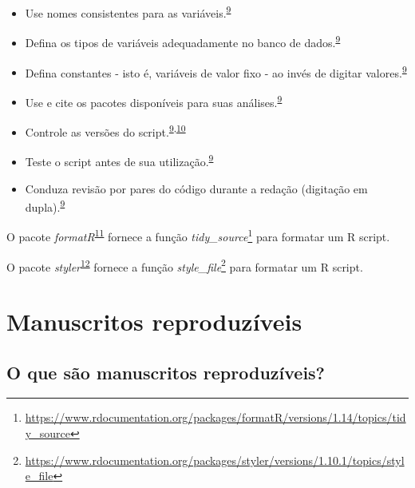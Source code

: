 \documentclass[
  a4paper,
]{book}
\renewcommand{\href}[2]{#2\footnote{\url{#1}}}
\newenvironment{infobox}[1]
  {
  \begin{itemize}
  \renewcommand{\labelitemi}{
    \raisebox{-.7\height}[0pt][0pt]{
      {\setkeys{Gin}{width=3em,keepaspectratio}
        \texttt{[image: \#1]}}
    }
  }
  \setlength{\fboxsep}{1em}
  \begin{blackbox}
  \item
  }
  {
  \end{blackbox}
  \end{itemize}
  }
\begin{document}
\begin{itemize}
\item
  Use nomes consistentes para as variáveis.\textsuperscript{\protect\hyperlink{ref-SchwabSimon2021}{9}}
\item
  Defina os tipos de variáveis adequadamente no banco de dados.\textsuperscript{\protect\hyperlink{ref-SchwabSimon2021}{9}}
\item
  Defina constantes - isto é, variáveis de valor fixo - ao invés de digitar valores.\textsuperscript{\protect\hyperlink{ref-SchwabSimon2021}{9}}
\item
  Use e cite os pacotes disponíveis para suas análises.\textsuperscript{\protect\hyperlink{ref-SchwabSimon2021}{9}}
\item
  Controle as versões do script.\textsuperscript{\protect\hyperlink{ref-SchwabSimon2021}{9},\protect\hyperlink{ref-Eglen2017}{10}}
\item
  Teste o script antes de sua utilização.\textsuperscript{\protect\hyperlink{ref-SchwabSimon2021}{9}}
\item
  Conduza revisão por pares do código durante a redação (digitação em dupla).\textsuperscript{\protect\hyperlink{ref-SchwabSimon2021}{9}}
\end{itemize}

\begin{infobox}{images/Rlogo}
O pacote \emph{formatR}\textsuperscript{\protect\hyperlink{ref-formatR}{11}} fornece a função \href{https://www.rdocumentation.org/packages/formatR/versions/1.14/topics/tidy_source}{\emph{tidy\_source}} para formatar um R script.

\end{infobox}

\begin{infobox}{images/Rlogo}
O pacote \emph{styler}\textsuperscript{\protect\hyperlink{ref-styler}{12}} fornece a função \href{https://www.rdocumentation.org/packages/styler/versions/1.10.1/topics/style_file}{\emph{style\_file}} para formatar um R script.

\end{infobox}

\hypertarget{relatuxf3rios-dinamicos}{%
\section{Manuscritos reproduzíveis}\label{relatuxf3rios-dinamicos}}

\hypertarget{o-que-suxe3o-manuscritos-reproduzuxedveis}{%
\subsection{O que são manuscritos reproduzíveis?}\label{o-que-suxe3o-manuscritos-reproduzuxedveis}}
\end{document}
